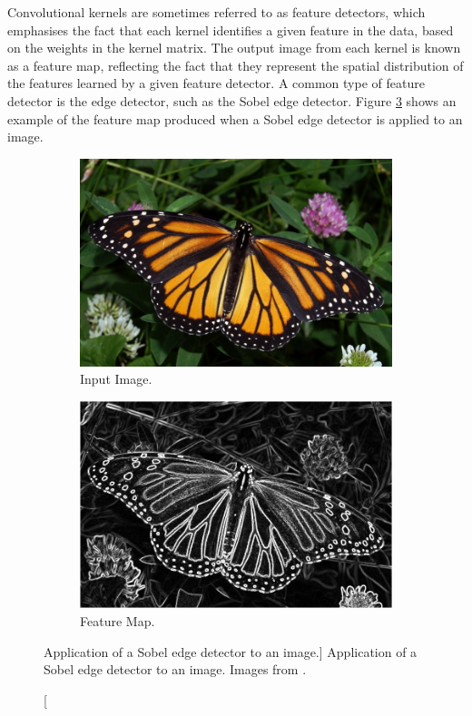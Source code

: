 Convolutional kernels are sometimes referred to as feature detectors, which 
emphasises the fact that each kernel identifies a given feature in the data, 
based on the weights in the kernel matrix. The output image from each kernel 
is known as a feature map, reflecting the fact that they represent the spatial 
distribution of the features learned by a given feature detector. A common type
of feature detector is the edge detector, such as the Sobel edge 
detector\cite{kanopoulos1988design}. Figure \ref{fig:edge_detector} shows an
example of the feature map produced when a Sobel edge detector is applied to an
image.
\begin{figure}

	\centering

	\begin{subfigure}[b]{0.49\textwidth}
		\centering
		\includegraphics[width=\textwidth]{figures/ed_input.jpg}
		\caption{Input Image.}
		\label{fig:ed_input}
	\end{subfigure}
	\hfill
	\begin{subfigure}[b]{0.49\textwidth}
		\centering
		\includegraphics[width=\textwidth]{figures/ed_feature_map.jpg}
		\caption{Feature Map.}
		\label{fig:ed_feature_map}
	\end{subfigure}

	\caption
	[Application of a Sobel edge detector to an image.]
	{Application of a Sobel edge detector to an image. Images from
	\cite{edge_detector}.}

	\label{fig:edge_detector}

\end{figure}

